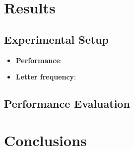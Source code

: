 \documentclass[a4paper, 12pt]{article}
\begin{document}
\section{Results}

\subsection{Experimental Setup}
\begin{itemize}
  \item \textbf{Performance}:
  \item \textbf{Letter frequency}:
\end{itemize}

\subsection{Performance Evaluation}


\section{Conclusions}
\end{document}
